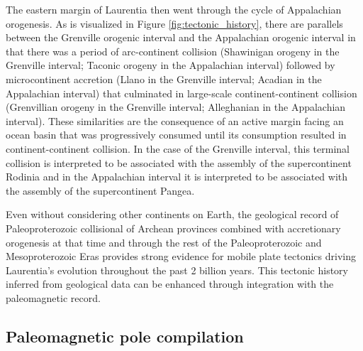 \documentclass[11pt,letterpaper]{article}
\begin{document}
The eastern margin of Laurentia then went through the cycle of Appalachian orogenesis. As is visualized in Figure \ref{fig:tectonic_history}, there are parallels between the Grenville orogenic interval and the Appalachian orogenic interval in that there was a period of arc-continent collision (Shawinigan orogeny in the Grenville interval; Taconic orogeny in the Appalachian interval) followed by microcontinent accretion (Llano in the Grenville interval; Acadian in the Appalachian interval) that culminated in large-scale continent-continent collision (Grenvillian orogeny in the Grenville interval; Alleghanian in the Appalachian interval). These similarities are the consequence of an active margin facing an ocean basin that was progressively consumed until its consumption resulted in continent-continent collision. In the case of the Grenville interval, this terminal collision is interpreted to be associated with the assembly of the supercontinent Rodinia and in the Appalachian interval it is interpreted to be associated with the assembly of the supercontinent Pangea.

Even without considering other continents on Earth, the geological record of Paleoproterozoic collisional of Archean provinces combined with accretionary orogenesis at that time and through the rest of the Paleoproterozoic and Mesoproterozoic Eras provides strong evidence for mobile plate tectonics driving Laurentia's evolution throughout the past 2 billion years. This tectonic history inferred from geological data can be enhanced through integration with the paleomagnetic record.

\subsection{Paleomagnetic pole compilation}
\end{document}
